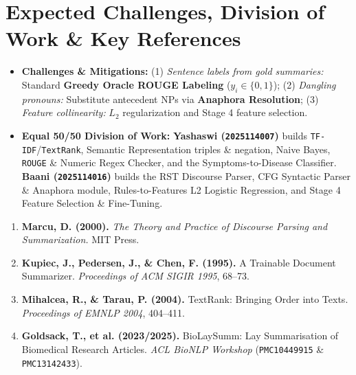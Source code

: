 \documentclass[11pt,a4paper]{article}
\begin{document}
\section{Expected Challenges, Division of Work \& Key References}
\begin{itemize}
    \item \textbf{Challenges \& Mitigations:} (1) \textit{Sentence labels from gold summaries:} Standard \textbf{Greedy Oracle ROUGE Labeling} ($y_i \in \{0,1\}$); (2) \textit{Dangling pronouns:} Substitute antecedent NPs via \textbf{Anaphora Resolution}; (3) \textit{Feature collinearity:} $L_2$ regularization and Stage 4 feature selection.
    \item \textbf{Equal 50/50 Division of Work:} \textbf{Yashaswi (\texttt{2025114007})} builds \texttt{TF-IDF}/\texttt{TextRank}, Semantic Representation triples \& negation, Naive Bayes, \texttt{ROUGE} \& Numeric Regex Checker, and the Symptoms-to-Disease Classifier. \textbf{Baani (\texttt{2025114016})} builds the RST Discourse Parser, CFG Syntactic Parser \& Anaphora module, Rules-to-Features L2 Logistic Regression, and Stage 4 Feature Selection \& Fine-Tuning.
\end{itemize}
\begin{enumerate}
    \item \textbf{Marcu, D. (2000).} \textit{The Theory and Practice of Discourse Parsing and Summarization.} MIT Press.
    \item \textbf{Kupiec, J., Pedersen, J., \& Chen, F. (1995).} A Trainable Document Summarizer. \textit{Proceedings of ACM SIGIR 1995}, 68--73.
    \item \textbf{Mihalcea, R., \& Tarau, P. (2004).} TextRank: Bringing Order into Texts. \textit{Proceedings of EMNLP 2004}, 404--411.
    \item \textbf{Goldsack, T., et al. (2023/2025).} BioLaySumm: Lay Summarisation of Biomedical Research Articles. \textit{ACL BioNLP Workshop} (\texttt{PMC10449915} \& \texttt{PMC13142433}).
\end{enumerate}
\end{document}
